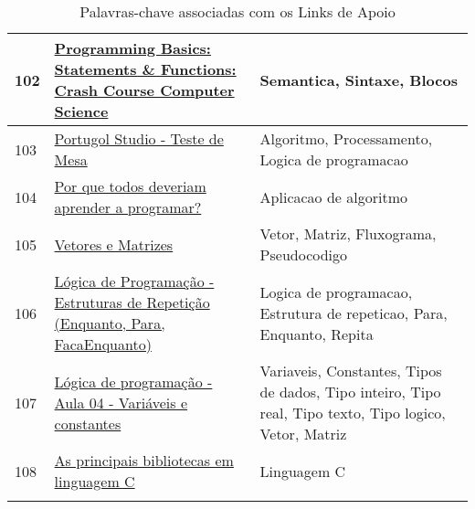 \begin{longtable}{| p{} | p{} | p{} |}
102 & \href{https://www.youtube.com/watch?v=l26oaHV7D40}{Programming Basics: Statements \& Functions: Crash Course Computer Science          } & Semantica, Sintaxe, Blocos                                                                                                                        \\ \hline
103 & \href{https://www.youtube.com/watch?v=Lelg\_sOYSm0}{Portugol Studio - Teste de Mesa                                                     } & Algoritmo, Processamento, Logica de programacao                                                                                                   \\ \hline
104 & \href{https://www.youtube.com/watch?v=mHW1Hsqlp6A}{Por que todos deveriam aprender a programar?                                        } & Aplicacao de algoritmo                                                                                                                            \\ \hline
105 & \href{https://www.youtube.com/watch?v=UuTmEcy5rV0}{Vetores e Matrizes                                                                  } & Vetor, Matriz, Fluxograma, Pseudocodigo                                                                                                           \\ \hline
106 & \href{https://www.youtube.com/watch?v=vgu8x\_Ivjd0}{Lógica de Programação - Estruturas de Repetição (Enquanto, Para, FacaEnquanto)      } & Logica de programacao, Estrutura de repeticao, Para, Enquanto, Repita                                                                             \\ \hline
107 & \href{https://www.youtube.com/watch?v=vp4jgXA\_BB0}{Lógica de programação - Aula 04 - Variáveis e constantes                            } & Variaveis, Constantes, Tipos de dados, Tipo inteiro, Tipo real, Tipo texto, Tipo logico, Vetor, Matriz                                            \\ \hline
108 & \href{https://www.zemoleza.com.br/trabalho-academico/exatas/informatica/as-principais-bibliotecas-em-linguagem-c/}{As principais bibliotecas em linguagem C                                            } & Linguagem C \\ \hline
\caption{Palavras-chave associadas com os Links de Apoio}
\label{tab:palavras-chave-links-de-apoio}
\end{longtable}
